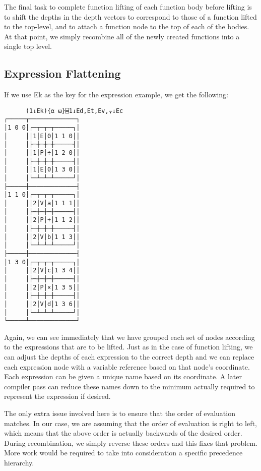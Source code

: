 \documentclass[numbers,preprint]{sigplanconf}
\begin{document}
The final task to complete function lifting of each function body before lifting is to shift the depths in 
the depth vectors to correspond to those of a function lifted to the top-level, and to attach a function 
node to the top of each of the bodies. At that point, we simply recombine all of the newly created functions 
into a single top level. 
\subsection{Expression Flattening}

If we use Ek as the key for the expression example, we get the following:

\begin{verbatim}
      (1↓Ek){⍺ ⍵}⌸1↓Ed,Et,Ev,⍪↓Ec
┌─────┬─────────────┐
│1 0 0│┌─┬─┬─┬─────┐│
│     ││1│E│0│1 1 0││
│     │├─┼─┼─┼─────┤│
│     ││1│P│÷│1 2 0││
│     │├─┼─┼─┼─────┤│
│     ││1│E│0│1 3 0││
│     │└─┴─┴─┴─────┘│
├─────┼─────────────┤
│1 1 0│┌─┬─┬─┬─────┐│
│     ││2│V│a│1 1 1││
│     │├─┼─┼─┼─────┤│
│     ││2│P│+│1 1 2││
│     │├─┼─┼─┼─────┤│
│     ││2│V│b│1 1 3││
│     │└─┴─┴─┴─────┘│
├─────┼─────────────┤
│1 3 0│┌─┬─┬─┬─────┐│
│     ││2│V│c│1 3 4││
│     │├─┼─┼─┼─────┤│
│     ││2│P│×│1 3 5││
│     │├─┼─┼─┼─────┤│
│     ││2│V│d│1 3 6││
│     │└─┴─┴─┴─────┘│
└─────┴─────────────┘
\end{verbatim}

Again, we can see immediately that we have grouped each set of nodes according to the expressions 
that are to be lifted. Just as in the case of function lifting, we can adjust the depths of each 
expression to the correct depth and we can replace each expression node with a variable reference
 based on that node’s coordinate. Each expression can be given a unique name based on its 
 coordinate. A later compiler pass can reduce these names down to the minimum actually required to 
 represent the expression if desired. 

The only extra issue involved here is to ensure that the order of evaluation matches. In our case, we 
are assuming that the order of evaluation is right to left, which means that the above order is actually 
backwards of the desired order. During recombination, we simply reverse these orders and this fixes 
that problem. More work would be required to take into consideration a specific precedence hierarchy. 
\end{document}
